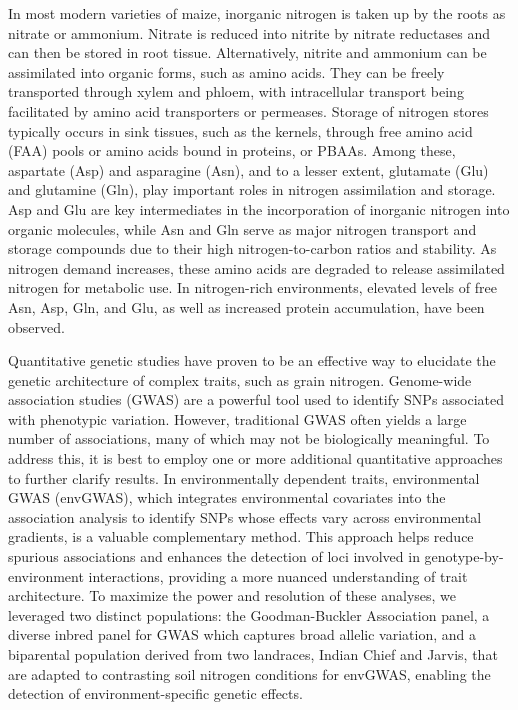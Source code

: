 \documentclass[pdflatex,sn-mathphys-num]{sn-jnl}%
\theoremstyle{thmstyleone}%
\theoremstyle{thmstyletwo}%
\theoremstyle{thmstylethree}%
\begin{document}
In most modern varieties of maize, inorganic nitrogen is taken up by the roots as nitrate or ammonium. Nitrate is reduced into nitrite by nitrate reductases and can then be stored in root tissue. Alternatively, nitrite and ammonium can be assimilated into organic forms, such as amino acids. They can be freely transported through xylem and phloem, with intracellular transport being facilitated by amino acid transporters or permeases. Storage of nitrogen stores typically occurs in sink tissues, such as the kernels, through free amino acid (FAA) pools or amino acids bound in proteins, or PBAAs.
Among these, aspartate (Asp) and asparagine (Asn), and to a lesser extent, glutamate (Glu) and glutamine (Gln), play important roles in nitrogen assimilation and storage. Asp and Glu are key intermediates in the incorporation of inorganic nitrogen into organic molecules, while Asn and Gln serve as major nitrogen transport and storage compounds due to their high nitrogen-to-carbon ratios and stability. As nitrogen demand increases, these amino acids are degraded to release assimilated nitrogen for metabolic use. In nitrogen-rich environments, elevated levels of free Asn, Asp, Gln, and Glu, as well as increased protein accumulation, have been observed.


Quantitative genetic studies have proven to be an effective way to elucidate the genetic architecture of complex traits, such as grain nitrogen. Genome-wide association studies (GWAS) are a powerful tool used to identify SNPs associated with phenotypic variation. However, traditional GWAS often yields a large number of associations, many of which may not be biologically meaningful. To address this, it is best to employ one or more additional quantitative approaches to further clarify results. In environmentally dependent traits, environmental GWAS (envGWAS), which integrates environmental covariates into the association analysis to identify SNPs whose effects vary across environmental gradients, is a valuable complementary method. This approach helps reduce spurious associations and enhances the detection of loci involved in genotype-by-environment interactions, providing a more nuanced understanding of trait architecture. To maximize the power and resolution of these analyses, we leveraged two distinct populations: the Goodman-Buckler Association panel, a diverse inbred panel for GWAS which captures broad allelic variation, and a biparental population derived from two landraces, Indian Chief and Jarvis, that are adapted to contrasting soil nitrogen conditions for envGWAS, enabling the detection of environment-specific genetic effects.
\end{document}
